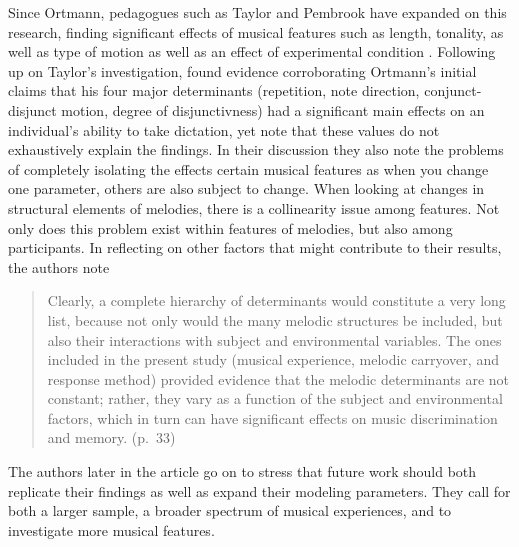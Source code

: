 \documentclass[]{book}
\begin{document}
Since Ortmann, pedagogues such as Taylor and Pembrook have expanded on this research, finding significant effects of musical features such as length, tonality, as well as type of motion as well as an effect of experimental condition \citep{taylorStrategiesMemoryShort1983}.
Following up on Taylor's investigation, \citet{pembrookInterferenceTranscriptionProcess1986} found evidence corroborating Ortmann's initial claims that his four major determinants (repetition, note direction, conjunct-disjunct motion, degree of disjunctivness) had a significant main effects on an individual's ability to take dictation, yet note that these values do not exhaustively explain the findings.
In their discussion they also note the problems of completely isolating the effects certain musical features as when you change one parameter, others are also subject to change.
When looking at changes in structural elements of melodies, there is a collinearity issue among features.
Not only does this problem exist within features of melodies, but also among participants.
In reflecting on other factors that might contribute to their results, the authors note

\begin{quote}
Clearly, a complete hierarchy of determinants would constitute a very long
list, because not only would the many melodic structures be included, but also
their interactions with subject and environmental variables. The ones included
in the present study (musical experience, melodic carryover, and response
method) provided evidence that the melodic determinants are not constant;
rather, they vary as a function of the subject and environmental factors, which
in turn can have significant effects on music discrimination and memory. (p.~33)
\end{quote}

The authors later in the article go on to stress that future work should both replicate their findings as well as expand their modeling parameters.
They call for both a larger sample, a broader spectrum of musical experiences, and to investigate more musical features.
\end{document}
